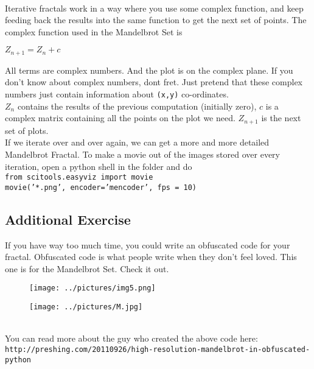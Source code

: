 \documentclass{article}
\begin{document}
\newline \\ Iterative fractals work in a way where you use some complex function, and keep 
feeding back the results into the same function to get the next set of points.
The complex function used in the Mandelbrot Set is
\begin{center} $Z_{n+1} = Z_n + c$ \end{center}
All terms are complex numbers. And the plot is on the complex plane. If 
you don't know about complex numbers, dont fret. Just pretend that these complex numbers 
just contain information about \texttt{(x,y)} co-ordinates. 
\newline \\ $Z_n$ contains the results of the previous computation (initially zero), $c$ is a complex matrix 
containing all the points on the plot we need. $Z_{n+1}$ is the next set of plots.
\newline \\ If we iterate over and over again, we can get a more and more detailed Mandelbrot Fractal.
To make a movie out of the images stored over every iteration, open a python shell in the folder and do
\newline \\ \texttt{from scitools.easyviz import movie}
\newline \\ \texttt{movie('*.png', encoder='mencoder', fps = 10)}
\subsection*{Additional Exercise}
If you have way too much time, you could write an obfuscated code for your fractal. Obfuscated code is what people write when they don't 
feel loved. This one is for the Mandelbrot Set. Check it out.
\begin{figure}[h]
\begin{center}
\texttt{[image: ../pictures/img5.png]}
\end{center}
\end{figure}
\newline
\begin{figure}[h]
\begin{center}
\texttt{[image: ../pictures/M.jpg]}
\end{center}
\end{figure}
\newline \\ You can read more about the guy who created the above code here:
\newline \\ \texttt{http://preshing.com/20110926/high-resolution-mandelbrot-in-obfuscated-python}
\end{document}
